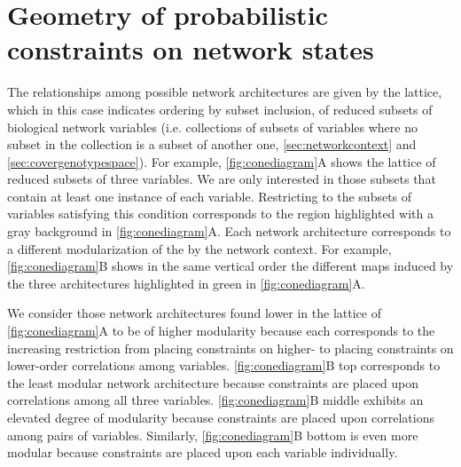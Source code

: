 \section{Geometry of probabilistic constraints on network states}\label{sec:probconstrgeometry}
The relationships among possible network architectures are given by the lattice, which in this case indicates ordering by subset inclusion, of reduced subsets of biological network variables (i.e. collections of subsets of variables where no subset in the collection is a subset of another one, \autoref{sec:networkcontext} and  \autoref{sec:covergenotypespace}). For example, \autoref{fig:conediagram}A shows the lattice of reduced subsets of three variables. We are only interested in those subsets that contain at least one instance of each variable. Restricting to the subsets of variables satisfying this condition corresponds to the region highlighted with a gray background in \autoref{fig:conediagram}A. Each network architecture corresponds to a different modularization of the \gnpm{} by the network context. For example, \autoref{fig:conediagram}B shows in the same vertical order the different maps induced by the three architectures highlighted in green in \autoref{fig:conediagram}A.

We consider those network architectures found lower in the lattice of \autoref{fig:conediagram}A to be of higher modularity because each corresponds to the increasing restriction from placing constraints on higher- to placing constraints on lower-order correlations among variables. \autoref{fig:conediagram}B top corresponds to the least modular network architecture because constraints are placed upon correlations among all three variables. \autoref{fig:conediagram}B middle exhibits an elevated degree of modularity because constraints are placed upon correlations among pairs of variables. Similarly, \autoref{fig:conediagram}B bottom is even more modular because constraints are placed upon each variable individually.

